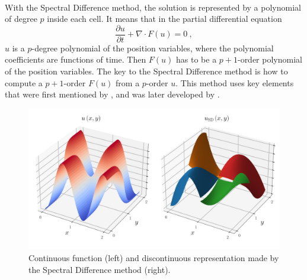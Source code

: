       \paragraph{}
      With the Spectral Difference method, the solution is represented by a polynomial of degree $p$ inside each cell.
      It means that in the partial differential equation
      \begin{equation}\label{eq:pde_2}
        \frac{\partial u}{\partial t} + \nabla \cdot F\left(u\right) = 0 \ ,
      \end{equation}
      $u$ is a $p$-degree polynomial of the position variables, where the polynomial coefficients are functions of time.
      Then $F\left(u\right)$ has to be a $p\!+\!1$-order polynomial of the position variables.
      The key to the Spectral Difference method is how to compute a $p + 1$-order $F\left(u\right)$ from a $p$-order $u$.
      This method uses key elements that were first mentioned by \cite{Kopriva1996}, and was later developed by \cite{LiuVinokurWang2006}.

      \begin{figure}
        \centering
        \includegraphics[width=\textwidth]{figures/sd_discontinuous.png}
        \caption{Continuous function (left) and discontinuous representation made by the Spectral Difference method (right).}
        \label{fig:sd_discontinuous}
      \end{figure}

